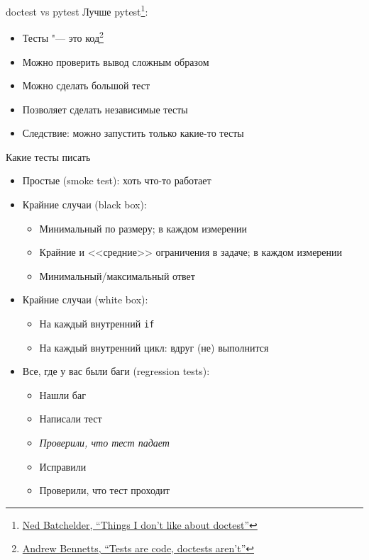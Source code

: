 \begin{frame}[t]{doctest vs pytest}
	Лучше pytest\footnote{\href{https://nedbatchelder.com/blog/200811/things_i_dont_like_about_doctest.html}{Ned Batchelder, ``Things I don’t like about doctest''}}:
	\begin{itemize}
	\item Тесты "--- это код\footnote{\href{https://bemusement.org/doctests-arent-code}{Andrew Bennetts, ``Tests are code, doctests aren't''}}
	\item Можно проверить вывод сложным образом
	\item Можно сделать большой тест
	\item Позволяет сделать независимые тесты
	\item Следствие: можно запустить только какие-то тесты
	\end{itemize}
\end{frame}

\begin{frame}[t]{Какие тесты писать}
	\begin{itemize}
	\item Простые (smoke test): хоть что-то работает
	\item Крайние случаи (black box):
		\begin{itemize}
		\item Минимальный по размеру; в каждом измерении
		\item Крайние и <<средние>> ограничения в задаче; в каждом измерении
		\item Минимальный/максимальный ответ
		\end{itemize}
	\item Крайние случаи (white box):
		\begin{itemize}
		\item На каждый внутренний \texttt{if}
		\item На каждый внутренний цикл: вдруг (не) выполнится
		\end{itemize}
	\item Все, где у вас были баги (regression tests):
		\begin{itemize}
		\item Нашли баг
		\item Написали тест
		\item \textit{Проверили, что тест падает}
		\item Исправили
		\item Проверили, что тест проходит
		\end{itemize}
	\end{itemize}
\end{frame}
